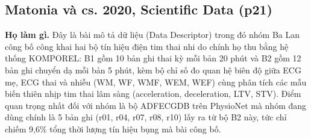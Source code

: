 \documentclass[12pt,a4paper]{article}
\begin{document}
\subsection{Matonia và cs. 2020, Scientific Data \normalfont\small (p21)}
\par\vspace{2pt}
\par\vspace{4pt}
\noindent \textbf{Họ làm gì.} Đây là bài mô tả dữ liệu (Data Descriptor) trong đó nhóm Ba Lan công bố công khai hai bộ tín hiệu điện tim thai nhi do chính họ thu bằng hệ thống KOMPOREL: B1 gồm 10 bản ghi thai kỳ mỗi bản 20 phút và B2 gồm 12 bản ghi chuyển dạ mỗi bản 5 phút, kèm bộ chỉ số đo quan hệ biên độ giữa ECG mẹ, ECG thai và nhiễu (WM, WF, WMF, WEM, WEF) cùng phân tích các mẫu biến thiên nhịp tim thai lâm sàng (acceleration, deceleration, LTV, STV). Điểm quan trọng nhất đối với nhóm là bộ ADFECGDB trên PhysioNet mà nhóm đang dùng chính là 5 bản ghi (r01, r04, r07, r08, r10) lấy ra từ bộ B2 này, tức chỉ chiếm 9,6\% tổng thời lượng tín hiệu bụng mà bài công bố.\par\vspace{3pt}
\end{document}
